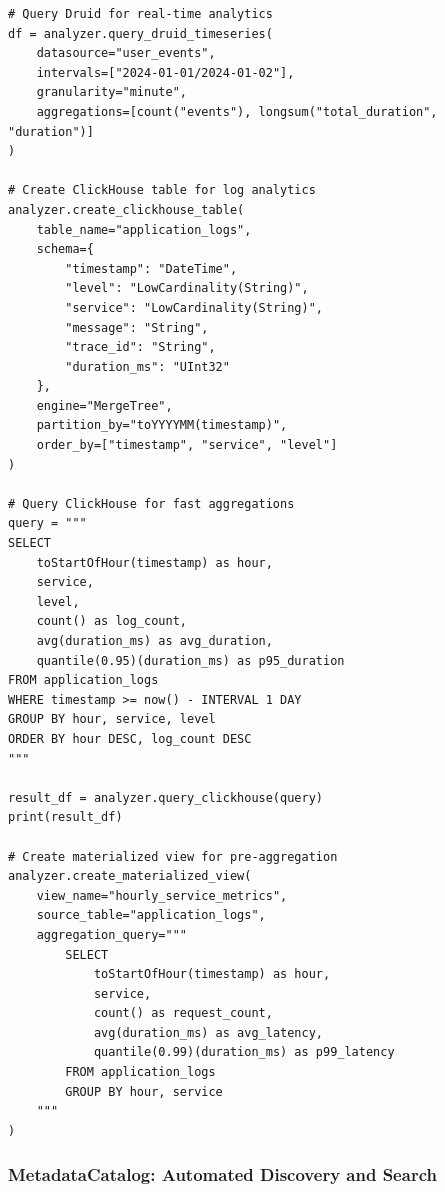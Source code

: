 \begin{lstlisting}[style=python, caption=RealtimeAnalyzer with Sub-Second Query Performance]
# Query Druid for real-time analytics
df = analyzer.query_druid_timeseries(
    datasource="user_events",
    intervals=["2024-01-01/2024-01-02"],
    granularity="minute",
    aggregations=[count("events"), longsum("total_duration", "duration")]
)

# Create ClickHouse table for log analytics
analyzer.create_clickhouse_table(
    table_name="application_logs",
    schema={
        "timestamp": "DateTime",
        "level": "LowCardinality(String)",
        "service": "LowCardinality(String)",
        "message": "String",
        "trace_id": "String",
        "duration_ms": "UInt32"
    },
    engine="MergeTree",
    partition_by="toYYYYMM(timestamp)",
    order_by=["timestamp", "service", "level"]
)

# Query ClickHouse for fast aggregations
query = """
SELECT
    toStartOfHour(timestamp) as hour,
    service,
    level,
    count() as log_count,
    avg(duration_ms) as avg_duration,
    quantile(0.95)(duration_ms) as p95_duration
FROM application_logs
WHERE timestamp >= now() - INTERVAL 1 DAY
GROUP BY hour, service, level
ORDER BY hour DESC, log_count DESC
"""

result_df = analyzer.query_clickhouse(query)
print(result_df)

# Create materialized view for pre-aggregation
analyzer.create_materialized_view(
    view_name="hourly_service_metrics",
    source_table="application_logs",
    aggregation_query="""
        SELECT
            toStartOfHour(timestamp) as hour,
            service,
            count() as request_count,
            avg(duration_ms) as avg_latency,
            quantile(0.99)(duration_ms) as p99_latency
        FROM application_logs
        GROUP BY hour, service
    """
)
\end{lstlisting}

\subsubsection{MetadataCatalog: Automated Discovery and Search}

